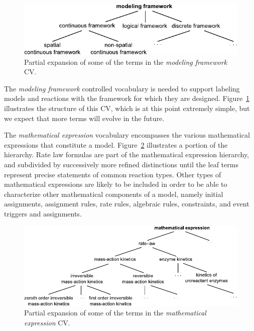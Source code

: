 \begin{figure}[tbh]
  \vspace*{1ex}
  \centering
  \includegraphics[scale = 0.9]{figs/sbo-framework}
  \vspace*{-2ex}
  \caption{Partial expansion of some of the terms in the
    \emph{modeling framework} CV.}
  \label{fig:expanded-framework}
\end{figure}


The \emph{modeling framework} controlled vocabulary is needed to
support labeling models and reactions with the framework for which
they are designed.  Figure~\ref{fig:expanded-framework}
illustrates the structure of this CV, which is at this point
extremely simple, but we expect that more terms will evolve in the
future.

The \emph{mathematical expression} vocabulary encompasses the various mathematical
expressions that constitute a model.
Figure~\ref{fig:sbo-math-expression} illustrates a portion of the
hierarchy.  Rate law formulas are part of the mathematical
expression hierarchy, and subdivided by successively more refined
distinctions until the leaf terms represent precise statements of
common reaction types.  Other types of mathematical expressions
are likely to be included in order to be able to characterize
other mathematical components of a model, namely initial
assignments, assignment rules, rate rules, algebraic rules,
constraints, and event triggers and assignments.

\begin{figure}[tbh]
  \centering
  \includegraphics[scale = 0.97]{figs/sbo-math-expression}
  \caption{Partial expansion of some of the terms in the \emph{mathematical
      expression} CV.}
  \label{fig:sbo-math-expression}
\end{figure}

